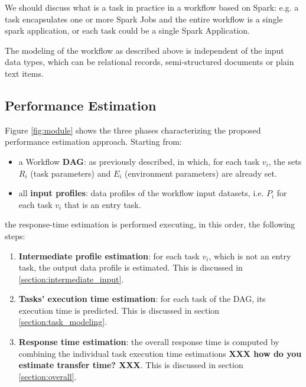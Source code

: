 \documentclass[a4paper, 10pt, conference]{ieeeconf}      %
\begin{document}
\color{red}
We should discuss what is a task in practice in a workflow based on Spark: e.g. a task encapsulates one or more Spark Jobs and the entire workflow is a single spark application, or each task could be a single Spark Application.
\color{black}

\color{blue}
The modeling of the workflow as described above is independent of the input data types, which can be relational records, semi-structured documents or plain text items.
\color{black}

\subsection{Performance Estimation}
\label{subsec:pipeline}
Figure \ref{fig:module} shows the three phases characterizing the proposed performance estimation approach. Starting from:
\begin{itemize}
    \item a Workflow \textbf{DAG}: as previously described, in which, for each task $v_i$, the sets $R_i$ (task parameters) and $E_i$ (environment parameters) are already set.
    \item all \textbf{input profiles}: data profiles of the workflow input datasets, i.e. $P_i$ for each task $v_i$ that is an entry task. 
\end{itemize}
the response-time estimation is performed executing, in this order, the following steps:
\begin{enumerate}
    \item \textbf{Intermediate profile estimation}: for each task $v_i$, which is not an entry task, the output data profile is estimated. This is discussed in \ref{section:intermediate_input}.
    \item \textbf{Tasks' execution time estimation}: for each task of the DAG, its execution time is predicted. This is discussed in section \ref{section:task_modeling}.
     \item \textbf{Response time estimation}: the overall response time is computed by combining the individual task execution time estimations \textbf{XXX how do you estimate transfer time? XXX}. This is discussed in section \ref{section:overall}.
\end{enumerate}
\end{document}
